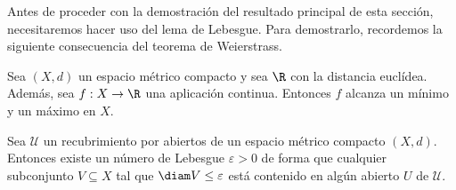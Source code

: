 Antes de proceder con la demostración del resultado principal de esta sección, necesitaremos hacer uso del lema de Lebesgue. Para demostrarlo, recordemos la siguiente consecuencia del teorema de Weierstrass.

\begin{corolario}
	\label{cor:teo-weierstrass}
	Sea $(X,d)$ un espacio métrico compacto y sea $\R$ con la distancia euclídea. Además, sea $f: X \to \R$ una aplicación continua. Entonces $f$ alcanza un mínimo y un máximo en $X$.
\end{corolario}
\begin{lema}
	\label{lem:lebesgue}
	Sea \(\mathcal{U}\) un recubrimiento por abiertos de un espacio métrico compacto \((X,d)\). Entonces existe un número de Lebesgue \(\varepsilon > 0\) de forma que cualquier subconjunto \(V \subseteq X\) tal que \(\diam V \leq \varepsilon\) está contenido en algún abierto \(U\) de \(\mathcal{U}\).
\end{lema}

